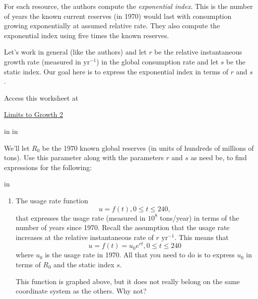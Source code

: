 \documentclass{ximera}
\newcommand{\pskip}{\vskip 0.1 in}
\begin{document}
For each resource, the authors compute the \emph{exponential index}. This is the number of years the known current reserves (in 1970) would last with consumption growing exponentially at assumed relative rate. They also compute the exponential index using five times the known reserves. 

\begin{question}   \label{Q34fratr5}
Let's work in general (like the authors) and let $r$ be the relative instantaneous growth rate (measured in $\text{yr}^{-1}$) in the global consumption rate and let $s$ be the static index. Our goal here is to express  the exponential index in terms of $r$ and $s$.  



 
\begin{onlineOnly}
    \begin{center}
\end{center}
\end{onlineOnly}

Access this worksheet at

\href{https://www.desmos.com/calculator/er2jq9vzeq}{Limits to Growth 2}

\pskip \pskip

We'll let $R_0$ be the 1970 known global reserves (in units of hundreds of millions of tons). Use this parameter along with the parameters $r$ and $s$ as need be, to find expressions for the following:

\pskip 

\begin{enumerate}

\item The usage rate function 
\[
     u = f(t) , 0\leq t \leq 240,
\]
that expresses the usage rate (measured in $10^8$ tons/year) in terms of the number of years since 1970. Recall the assumption that the usage rate increases at the relative instantaneous rate of $r \text{ yr}^{-1}$. This means that
\[
    u  = f(t) = u_0 e^{rt}, 0\leq t \leq 240
\]
where $u_0$ is the usage rate in 1970. All that you need to do is to express $u_0$ in terms of $R_0$ and the static index $s$.


This function is graphed above, but it does not really belong on the same coordinate system as the others. Why not?


\end{enumerate}
\end{question}
\end{document}

